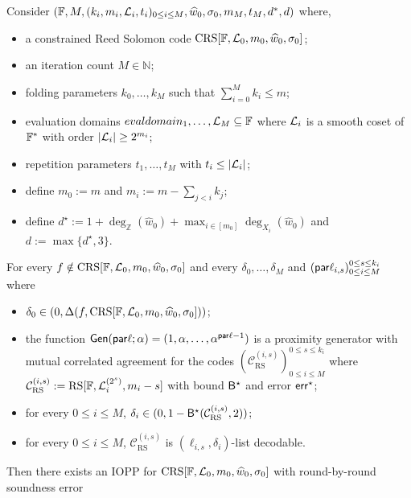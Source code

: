 \begin{theorem}
    Consider $(\mathbb{F}, M, (k_i, m_i, \mathcal{L}_i, t_i)_{0 \leq i \leq M}, \widehat{w}_0, \sigma_0, m_M, t_M, d^*, d)$ where,
    \begin{itemize}
  \item a constrained Reed Solomon code $\mathrm{CRS}[\mathbb{F}, \mathcal{L}_0, m_0, \widehat{w}_0, \sigma_0]$;
  \item an iteration count $M \in \mathbb{N}$;
  \item folding parameters $k_0, \ldots, k_{M}$ such that $\sum_{i=0}^{M} k_i \leq m$;
  \item evaluation domains $evaldomain_1, \ldots, \mathcal{L}_{M} \subseteq \mathbb{F}$ where $\mathcal{L}_i$ is a smooth coset of $\mathbb{F}^*$ with order $|\mathcal{L}_i| \geq 2^{m_i}$;
  \item repetition parameters $t_1, \ldots, t_M$ with $t_i \leq |\mathcal{L}_i|$;
  \item define $m_0 := m$ and $m_i := m - \sum_{j < i} k_j$;
  \item define $d^\star := 1 + \deg_{\mathbb{Z}}(\widehat{w}_0) + \max_{i \in [m_0]} \deg_{X_i}(\widehat{w}_0)$ and $d := \max\{d^\star, 3\}$.
    \end{itemize}
    For every $f \notin \mathrm{CRS}[\mathbb{F}, \mathcal{L}_0, m_0, \widehat{w}_0, \sigma_0]$ and every $\delta_0, \dots, \delta_{M}$ and $(\mathsf{par}\ell_{i,s})_{0 \leq i \leq M}^{0 \leq s \leq k_i}$ where
    \begin{itemize}
        \item $\delta_0 \in (0, \Delta(f, \mathrm{CRS}[\mathbb{F}, \mathcal{L}_0, m_0, \widehat{w}_0, \sigma_0]))$;
        \item the function $\mathsf{Gen}(\mathsf{par}\ell; \alpha) = (1, \alpha, \dots, \alpha^{\mathsf{par}\ell-1})$ is a proximity generator with mutual correlated agreement for the codes $(\mathcal{C}_{\mathrm{RS}}^{(i,s)})_{0 \leq i \leq M}^{0 \leq s \leq k_i}$ where $\mathcal{C}_{\mathrm{RS}}^{(i,s)} := \mathrm{RS}[\mathbb{F}, \mathcal{L}_i^{(2^s)}, m_i - s]$ with bound ${\mathsf{B}}^\star$ and error $\mathsf{err}^\star$;
        \item for every $0 \leq i \le M$, $\delta_i \in (0, 1 - {\mathsf{B}}^\star(\mathcal{C}_{\mathrm{RS}}^{(i,s)}, 2))$;
        \item for every $0 \leq i \le M$, $\mathcal{C}_{\mathrm{RS}}^{(i,s)}$ is $(\ell_{i,s}, \delta_i)$-list decodable.
    \end{itemize}
   Then there exists an IOPP for $\mathrm{CRS}[\mathbb{F}, \mathcal{L}_0, m_0, \widehat{w}_0, \sigma_0]$ with round-by-round soundness error


\end{theorem}

